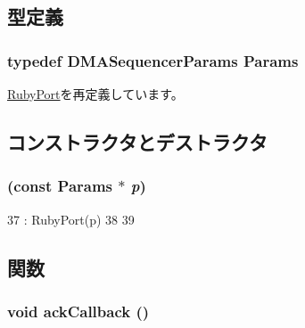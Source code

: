 \subsection{型定義}
\hypertarget{classDMASequencer_a9827bc75ea7fc70f8a78d2545226f251}{
\subsubsection[{Params}]{\setlength{\rightskip}{0pt plus 5cm}typedef DMASequencerParams {\bf Params}}}
\label{classDMASequencer_a9827bc75ea7fc70f8a78d2545226f251}


\hyperlink{classRubyPort_a73ffda3b6b10849321fd359baf61eb3c}{RubyPort}を再定義しています。

\subsection{コンストラクタとデストラクタ}
\hypertarget{classDMASequencer_ac1df3c513bd70ee946eeead01f511cc8}{
\subsubsection[{DMASequencer}]{ (const {\bf Params} $\ast$ {\em p})}}
\label{classDMASequencer_ac1df3c513bd70ee946eeead01f511cc8}



\begin{DoxyCode}
37     : RubyPort(p)
38 {
39 }
\end{DoxyCode}


\subsection{関数}
\hypertarget{classDMASequencer_ad9143b6ab846dfde9ff4bda44b19f749}{
\subsubsection[{ackCallback}]{\setlength{\rightskip}{0pt plus 5cm}void ackCallback ()}}
\label{classDMASequencer_ad9143b6ab846dfde9ff4bda44b19f749}




